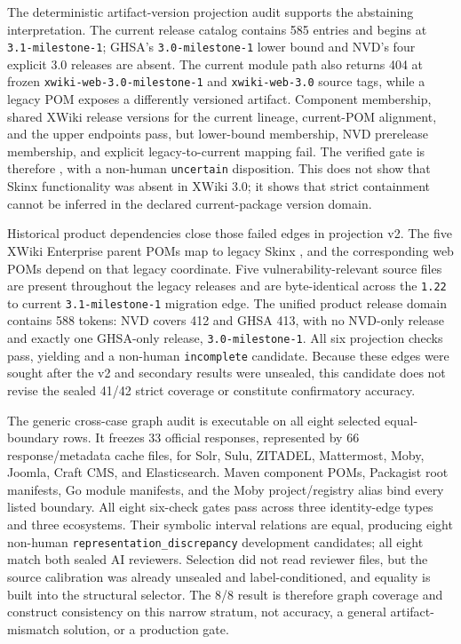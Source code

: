 The deterministic artifact-version projection audit supports the abstaining interpretation. The current  release catalog contains 585 entries and begins at \texttt{3.1-milestone-1}; GHSA's \texttt{3.0-milestone-1} lower bound and NVD's four explicit 3.0 releases are absent. The current module path also returns 404 at frozen \texttt{xwiki-web-3.0-milestone-1} and \texttt{xwiki-web-3.0} source tags, while a legacy POM exposes a differently versioned  artifact. Component membership, shared XWiki release versions for the current lineage, current-POM alignment, and the upper endpoints pass, but lower-bound membership, NVD prerelease membership, and explicit legacy-to-current mapping fail. The verified gate is therefore , with a non-human \texttt{uncertain} disposition. This does not show that Skinx functionality was absent in XWiki 3.0; it shows that strict containment cannot be inferred in the declared current-package version domain.

Historical product dependencies close those failed edges in projection v2. The five XWiki Enterprise parent POMs map  to legacy Skinx , and the corresponding web POMs depend on that legacy coordinate. Five vulnerability-relevant source files are present throughout the legacy releases and are byte-identical across the \texttt{1.22} to current \texttt{3.1-milestone-1} migration edge. The unified product release domain contains 588 tokens: NVD covers 412 and GHSA 413, with no NVD-only release and exactly one GHSA-only release, \texttt{3.0-milestone-1}. All six projection checks pass, yielding  and a non-human \texttt{incomplete} candidate. Because these edges were sought after the v2 and secondary results were unsealed, this candidate does not revise the sealed 41/42 strict coverage or constitute confirmatory accuracy.

The generic cross-case graph audit is executable on all eight selected equal-boundary rows. It freezes 33 official responses, represented by 66 response/metadata cache files, for Solr, Sulu, ZITADEL, Mattermost, Moby, Joomla, Craft CMS, and Elasticsearch. Maven component POMs, Packagist root manifests, Go module manifests, and the Moby project/registry alias bind every listed boundary. All eight six-check gates pass across three identity-edge types and three ecosystems. Their symbolic interval relations are equal, producing eight non-human \texttt{representation\_discrepancy} development candidates; all eight match both sealed AI reviewers. Selection did not read reviewer files, but the source calibration was already unsealed and label-conditioned, and equality is built into the structural selector. The 8/8 result is therefore graph coverage and construct consistency on this narrow stratum, not accuracy, a general artifact-mismatch solution, or a production gate.

